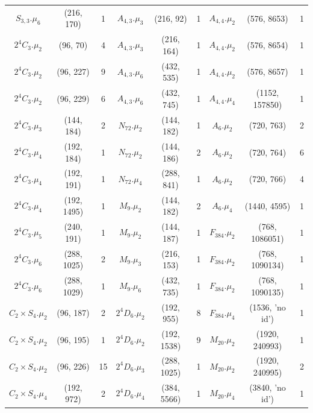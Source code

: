 \documentclass[a4paper]{amsart}
\theoremstyle{definition}
\theoremstyle{plain}
\begin{document}
{\begin{longtable}{ccc|ccc|ccc}
$S_{3,3}.\mu_{6}$&(216, 170)&1 & $A_{4,3}.\mu_{3}$&(216, 92)&1 & $A_{4,4}.\mu_{2}$&(576, 8653)&1\\
\rowcolor{lightgray}
$2^4C_3.\mu_{2}$&(96, 70)&4 & $A_{4,3}.\mu_{3}$&(216, 164)&1 & $A_{4,4}.\mu_{2}$&(576, 8654)&1\\
$2^4C_3.\mu_{2}$&(96, 227)&9 & $A_{4,3}.\mu_{6}$&(432, 535)&1 & $A_{4,4}.\mu_{2}$&(576, 8657)&1\\
\rowcolor{lightgray}
$2^4C_3.\mu_{2}$&(96, 229)&6 & $A_{4,3}.\mu_{6}$&(432, 745)&1 & $A_{4,4}.\mu_{4}$&(1152, 157850)&1\\
$2^4C_3.\mu_{3}$&(144, 184)&2 & $N_{72}.\mu_{2}$&(144, 182)&1 & $A_6.\mu_{2}$&(720, 763)&2\\
\rowcolor{lightgray}
$2^4C_3.\mu_{4}$&(192, 184)&1 & $N_{72}.\mu_{2}$&(144, 186)&2 & $A_6.\mu_{2}$&(720, 764)&6\\
$2^4C_3.\mu_{4}$&(192, 191)&1 & $N_{72}.\mu_{4}$&(288, 841)&1 & $A_6.\mu_{2}$&(720, 766)&4\\
\rowcolor{lightgray}
$2^4C_3.\mu_{4}$&(192, 1495)&1 & $M_9.\mu_{2}$&(144, 182)&2 & $A_6.\mu_{4}$&(1440, 4595)&1\\
$2^4C_3.\mu_{5}$&(240, 191)&1 & $M_9.\mu_{2}$&(144, 187)&1 & $F_{384}.\mu_{2}$&(768, 1086051)&1\\
\rowcolor{lightgray}
$2^4C_3.\mu_{6}$&(288, 1025)&2 & $M_9.\mu_{3}$&(216, 153)&1 & $F_{384}.\mu_{2}$&(768, 1090134)&1\\
$2^4C_3.\mu_{6}$&(288, 1029)&1 & $M_9.\mu_{6}$&(432, 735)&1 & $F_{384}.\mu_{2}$&(768, 1090135)&1\\
\rowcolor{lightgray}
$C_2 \times S_4.\mu_{2}$&(96, 187)&2 & $2^4D_6.\mu_{2}$&(192, 955)&8 & $F_{384}.\mu_{4}$&(1536, 'no id')&1\\
$C_2 \times S_4.\mu_{2}$&(96, 195)&1 & $2^4D_6.\mu_{2}$&(192, 1538)&9 & $M_{20}.\mu_{2}$&(1920, 240993)&1\\
\rowcolor{lightgray}
$C_2 \times S_4.\mu_{2}$&(96, 226)&15 & $2^4D_6.\mu_{3}$&(288, 1025)&1 & $M_{20}.\mu_{2}$&(1920, 240995)&2\\
$C_2 \times S_4.\mu_{4}$&(192, 972)&2 & $2^4D_6.\mu_{4}$&(384, 5566)&1 & $M_{20}.\mu_{4}$&(3840, 'no id')&1\\
%
%
%
%
%
%
%
%
%
%
%
%
%
%
%
%
%
%
%
%
%
%
%
%
%
%
%
%
%
%
%
%
%
%
%
%
%
%
%
%
%
%
%
%
%
%
%
%
%
%
%
%
%
%
%
%
%
%
%
%
%
%
%
%
%
%
%
%
%
%
%
%
%
%
%
%
%
%
%
%
%
%
%
%
%
%
%
%
%
%
%
%
%
%
%
%
%
%
%
%
%
%
%
%
%
%
%
%
%
%
%
%
%
%
%
%
%
%
%
%
%
%
%
%
%
%
%
%
%
%
%
%
%
%
%
%
%
%
%
%
%
%
%
%
%
%
%
%
%
%
%
%
%
%
%
%
%
%
%
%
%
%
%
%
%
%
%
%
%
%
%
%
%
%
%
%
%
%
%
%
%
%
%
%
%
%
%
%
%
%
%
%
%
%
%
%
%
%
%
%
%
%
%
%
%
%
%
%
%
%
%
%
%
%
%
%
%
%
%
%
%
%
%
%
%
%
%
%
%
%
%
%
%
%
%
%
%
%
%
%
%
%
%
%
%
%
%
%
%
%
%
%
%
%
%
%
%
%
%
%
%
%
%
%
%
%
%
%
%
%
%
%
%
%
%
%
%
%
%
\bottomrule
\end{longtable}
}
\end{document}
